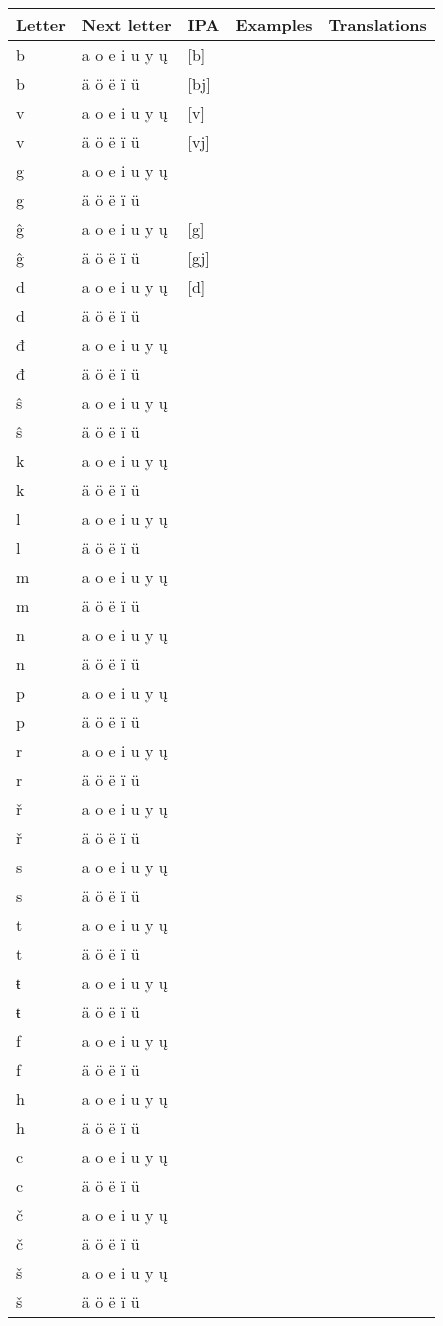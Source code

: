 \begin{longtable}{lllll}
		Letter & Next letter & IPA & Examples & Translations \\
		\endhead
		b & a o e i u y ų  & [b] && \\
		b & ä ö ë ï ü & [bj] && \\
		v & a o e i u y ų & [v] && \\
		v & ä ö ë ï ü & [vj] && \\
		g & a o e i u y ų  & && \\
		g & ä ö ë ï ü &&& \\
		ĝ & a o e i u y ų  & [g] && \\
		ĝ & ä ö ë ï ü & [gj] && \\
		d & a o e i u y ų & [d] && \\
		d & ä ö ë ï ü &&& \\	
		đ & a o e i u y ų  &&& \\
		đ & ä ö ë ï ü &&& \\
		ŝ & a o e i u y ų  &&& \\
		ŝ & ä ö ë ï ü &&& \\
		k & a o e i u y ų &&& \\  
		k & ä ö ë ï ü  &&& \\ 
		l & a o e i u y ų  &&& \\  
		l & ä ö ë ï ü  &&& \\ 
		m & a o e i u y ų  &&& \\  
		m & ä ö ë ï ü  &&& \\
		n & a o e i u y ų  &&& \\  
		n & ä ö ë ï ü  &&& \\
		p & a o e i u y ų &&& \\  
		p & ä ö ë ï ü  &&& \\ 
		r & a o e i u y ų  &&& \\  
		r & ä ö ë ï ü  &&& \\
		ř & a o e i u y ų  &&& \\  
		ř & ä ö ë ï ü  &&& \\ 
		s & a o e i u y ų &&& \\  
		s & ä ö ë ï ü  &&& \\ 
		t & a o e i u y ų  &&& \\ 
		t & ä ö ë ï ü  &&& \\ 
		ŧ & a o e i u y ų  &&& \\  
		ŧ & ä ö ë ï ü  &&& \\ 
		f & a o e i u y ų  &&& \\  
		f & ä ö ë ï ü  &&& \\
		h & a o e i u y ų   &&& \\
		h & ä ö ë ï ü  &&& \\
		c & a o e i u y ų   &&& \\
		c & ä ö ë ï ü  &&& \\
		č & a o e i u y ų   &&& \\
		č & ä ö ë ï ü  &&& \\
		š & a o e i u y ų   &&& \\
		š & ä ö ë ï ü  &&& \\		
\end{longtable}

